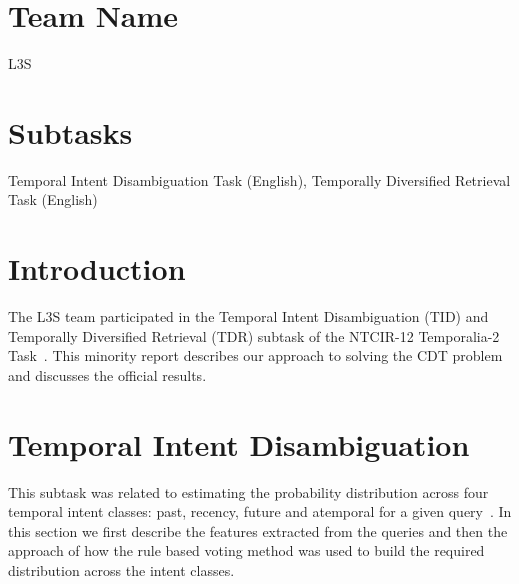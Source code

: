 \documentclass{sig-alternate}
\begin{document}
\section*{Team Name}
L3S

\section*{Subtasks}
Temporal Intent Disambiguation Task (English), Temporally Diversified Retrieval Task (English)


\section{Introduction}

The L3S team participated in the Temporal Intent Disambiguation (TID) and Temporally Diversified Retrieval (TDR) subtask of the NTCIR-12 Temporalia-2 Task~\cite{mioverview}.
This minority report describes our approach to solving the CDT problem and discusses the official results.

\section{Temporal Intent Disambiguation}
This subtask was related to estimating the probability distribution across four temporal intent classes: past, recency, future and atemporal for a given query~\cite{mioverview}. In this section we first describe the features extracted from the queries and then the approach of how the rule based voting method was used to build the required distribution across the intent classes.
\end{document}
